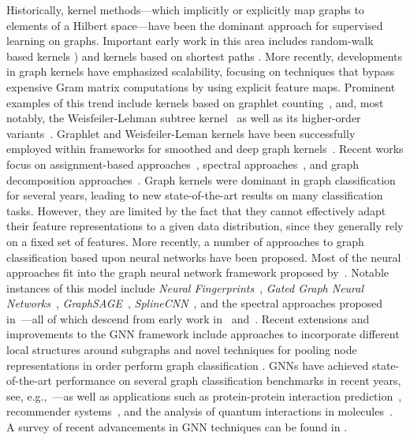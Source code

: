 \documentclass[letterpaper]{article}
\theoremstyle{definition}
\newcommand{\new}[1]{\emph{#1}}
\begin{document}
Historically, kernel methods---which implicitly or explicitly map graphs to elements of a Hilbert space---have been the dominant approach for supervised learning on graphs. 
Important early work in this area includes random-walk based kernels \cite{Gae+2003,Kas+2003}) and kernels based on shortest paths \cite{Borgwardt2005}.
More recently, developments in graph kernels have emphasized scalability, focusing on techniques that bypass expensive Gram matrix computations by using explicit feature maps.
Prominent examples of this trend include kernels based on graphlet counting~\cite{She+2009}, and, most notably, the Weisfeiler-Lehman subtree kernel~\cite{She+2011} as well as its higher-order variants~\cite{Mor+2017}. 
Graphlet and Weisfeiler-Leman kernels have been successfully employed within frameworks for smoothed and deep graph kernels~\cite{Yan+2015,Yan+2015a}. Recent works focus on assignment-based approaches~\cite{Kri+2016,Nik+2017,Joh+2015}, spectral approaches~\cite{Kon+2016}, and graph decomposition approaches~\cite{Nik+2018}.
Graph kernels were dominant in graph classification for several years, leading to new state-of-the-art results on many classification tasks. 
However, they are limited by the fact that they cannot effectively adapt their feature representations to a given data distribution, since they generally rely on a fixed set of features. More recently, a number of approaches to graph classification based upon neural networks have been proposed. 
Most of the neural approaches fit into the graph neural network framework proposed by~\cite{Gil+2017}. Notable instances of this model include \new{Neural Fingerprints}~\cite{Duv+2015}, \emph{Gated Graph Neural Networks}~\cite{Li+2016}, \emph{GraphSAGE}~\cite{Ham+2017}, \emph{SplineCNN}~\cite{Fey+2018}, and the spectral approaches proposed in~\cite{Bru+2014,Def+2015,Kip+2017}---all of which descend from early work in~\cite{Mer+2005} and~\cite{Sca+2009}.
Recent extensions and improvements to the GNN framework include approaches to incorporate different local structures around subgraphs \cite{Xu+2018} and novel techniques for pooling node representations in order perform graph classification \cite{Zha+2018,Yin+2018}.
GNNs have achieved state-of-the-art performance on several graph classification benchmarks in recent years, see, e.g.,~\cite{Yin+2018}---as well as applications such as protein-protein interaction prediction~\cite{Fou+2017}, recommender systems~\cite{Yin+2018a}, and the analysis of quantum interactions in molecules~\cite{Sch+2017}.
A survey of recent advancements in GNN techniques can be found in \cite{Ham+2017a}.
\end{document}
